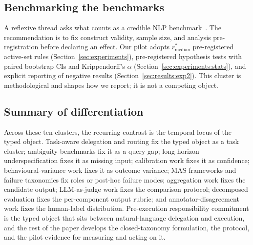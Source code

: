 \subsection{Benchmarking the benchmarks}
\label{sec:related:benchmarking}

A reflexive thread asks what counts as a credible NLP benchmark~\cite{bowman2022benchmarking}. The recommendation is to fix construct validity, sample size, and analysis pre-registration before declaring an effect. Our pilot adopts $r^*_{\text{median}}$ pre-registered active-set rules (Section~\ref{sec:experiments}), pre-registered hypothesis tests with paired bootstrap CIs and Krippendorff's $\alpha$ (Section~\ref{sec:experiments:stats}), and explicit reporting of negative results (Section~\ref{sec:results:exp2}). This cluster is methodological and shapes how we report; it is not a competing object.

\subsection{Summary of differentiation}
\label{sec:related:summary}

Across these ten clusters, the recurring contrast is the temporal locus of the typed object. Task-aware delegation and routing fix the typed object as a task cluster; ambiguity benchmarks fix it as a query gap; long-horizon underspecification fixes it as missing input; calibration work fixes it as confidence; behavioural-variance work fixes it as outcome variance; MAS frameworks and failure taxonomies fix roles or post-hoc failure modes; aggregation work fixes the candidate output; LLM-as-judge work fixes the comparison protocol; decomposed evaluation fixes the per-component output rubric; and annotator-disagreement work fixes the human-label distribution. Pre-execution responsibility commitment is the typed object that sits between natural-language delegation and execution, and the rest of the paper develops the closed-taxonomy formulation, the protocol, and the pilot evidence for measuring and acting on it.
